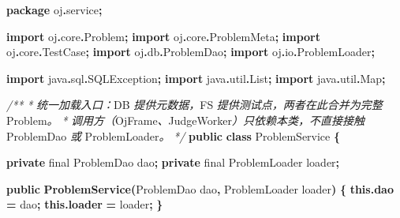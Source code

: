 \documentclass[
  11pt,
]{ctexart}
\newenvironment{Shaded}{\begin{snugshade}}{\end{snugshade}}
\newcommand{\CommentTok}[1]{\textcolor[rgb]{0.56,0.35,0.01}{\textit{#1}}}
\newcommand{\DataTypeTok}[1]{\textcolor[rgb]{0.13,0.29,0.53}{#1}}
\newcommand{\FunctionTok}[1]{\textcolor[rgb]{0.13,0.29,0.53}{\textbf{#1}}}
\newcommand{\ImportTok}[1]{#1}
\newcommand{\KeywordTok}[1]{\textcolor[rgb]{0.13,0.29,0.53}{\textbf{#1}}}
\newcommand{\NormalTok}[1]{#1}
\newcommand{\OperatorTok}[1]{\textcolor[rgb]{0.81,0.36,0.00}{\textbf{#1}}}
\begin{document}
\begin{Shaded}
\begin{Highlighting}[]
\KeywordTok{package}\ImportTok{ oj}\OperatorTok{.}\ImportTok{service}\OperatorTok{;}

\KeywordTok{import} \ImportTok{oj}\OperatorTok{.}\ImportTok{core}\OperatorTok{.}\ImportTok{Problem}\OperatorTok{;}
\KeywordTok{import} \ImportTok{oj}\OperatorTok{.}\ImportTok{core}\OperatorTok{.}\ImportTok{ProblemMeta}\OperatorTok{;}
\KeywordTok{import} \ImportTok{oj}\OperatorTok{.}\ImportTok{core}\OperatorTok{.}\ImportTok{TestCase}\OperatorTok{;}
\KeywordTok{import} \ImportTok{oj}\OperatorTok{.}\ImportTok{db}\OperatorTok{.}\ImportTok{ProblemDao}\OperatorTok{;}
\KeywordTok{import} \ImportTok{oj}\OperatorTok{.}\ImportTok{io}\OperatorTok{.}\ImportTok{ProblemLoader}\OperatorTok{;}

\KeywordTok{import} \ImportTok{java}\OperatorTok{.}\ImportTok{sql}\OperatorTok{.}\ImportTok{SQLException}\OperatorTok{;}
\KeywordTok{import} \ImportTok{java}\OperatorTok{.}\ImportTok{util}\OperatorTok{.}\ImportTok{List}\OperatorTok{;}
\KeywordTok{import} \ImportTok{java}\OperatorTok{.}\ImportTok{util}\OperatorTok{.}\ImportTok{Map}\OperatorTok{;}

\CommentTok{/**}
 \CommentTok{*} \CommentTok{统一加载入口：}\NormalTok{DB }\CommentTok{提供元数据，}\NormalTok{FS }\CommentTok{提供测试点，两者在此合并为完整}\NormalTok{ Problem}\CommentTok{。}
 \CommentTok{*} \CommentTok{调用方（}\NormalTok{OjFrame}\CommentTok{、}\NormalTok{JudgeWorker}\CommentTok{）只依赖本类，不直接接触}\NormalTok{ ProblemDao }\CommentTok{或}\NormalTok{ ProblemLoader}\CommentTok{。}
 \CommentTok{*/}
\KeywordTok{public} \KeywordTok{class}\NormalTok{ ProblemService }\OperatorTok{\{}

    \KeywordTok{private} \DataTypeTok{final}\NormalTok{ ProblemDao dao}\OperatorTok{;}
    \KeywordTok{private} \DataTypeTok{final}\NormalTok{ ProblemLoader loader}\OperatorTok{;}

    \KeywordTok{public} \FunctionTok{ProblemService}\OperatorTok{(}\NormalTok{ProblemDao dao}\OperatorTok{,}\NormalTok{ ProblemLoader loader}\OperatorTok{)} \OperatorTok{\{}
        \KeywordTok{this}\OperatorTok{.}\FunctionTok{dao} \OperatorTok{=}\NormalTok{ dao}\OperatorTok{;}
        \KeywordTok{this}\OperatorTok{.}\FunctionTok{loader} \OperatorTok{=}\NormalTok{ loader}\OperatorTok{;}
    \OperatorTok{\}}


\end{Highlighting}
\end{Shaded}
\end{document}
